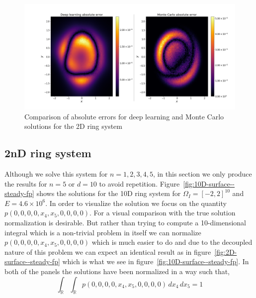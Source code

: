 \begin{figure}[!ht]
    \centering
\includegraphics[scale=0.32]{steady-fp/plots/steady-plots-2D-error.png}
\caption{Comparison of absolute errors for deep learning and Monte Carlo solutions for the 2D ring system}
    \label{fig:MC-comparison--steady-fp}
\end{figure}

\subsection{2nD ring system}
Although we solve this system for $n=1,2,3,4,5$, in this section we only produce the results for $n=5$ or $d=10$ to avoid repetition. Figure~\ref{fig:10D-surface--steady-fp} shows the solutions for  the 10D ring system for $\Omega_I=[-2, 2]^{10}$ and $E=4.6\times10^6$. In order to visualize the solution we focus on the quantity
$
    p(0, 0, 0, 0, x_4, x_5, 0, 0, 0, 0)
$.
For a visual comparison with the true solution normalization is desirable. But rather than trying to compute a 10-dimensional integral which is a non-trivial problem in itself we can normalize $
    p(0, 0, 0, 0, x_4, x_5, 0, 0, 0, 0)
$ which is much easier to do and due to the decoupled nature of this problem we can expect an identical result as in figure~\ref{fig:2D-surface--steady-fp} which is what we see in figure~\ref{fig:10D-surface--steady-fp}. In both of the panels the solutions have been normalized in a way such that,
$$\int_{\mathbb R}\int_{\mathbb R}p(0, 0, 0, 0, x_4, x_5, 0, 0, 0, 0)\,dx_4\,dx_5=1$$

